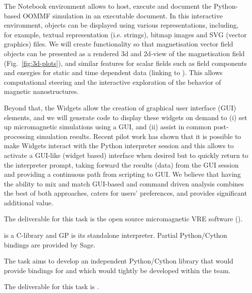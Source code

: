 \begin{workpackage}
\begin{tasklist}
\begin{task}[lead=USO,title=Case study: micromagnetic VRE built from
  \TheProject,id=oommf-py-ipython-attributes,PM=6,partners={SR,USH}]
  The \Jupyter Notebook environment allows to host, execute and
  document the Python-based OOMMF simulation in an executable
  document. In this interactive environment, objects can be displayed
  using various representations, including, for example, textual
  representation (i.e. strings), bitmap images and SVG (vector
  graphics) files. We will create functionality so that magnetisation
  vector field objects can be presented as a rendered 3d and 2d-view
  of the magnetisation field (Fig.~\ref{fig:3d-plots}), and similar
  features for scalar fields such as field components and energies for
  static and time dependent data (linking to
  ). This allows computational steering and the
  interactive exploration of the behavior of magnetic nanostructures.

  Beyond that, the \Jupyter Widgets allow the creation of graphical
  user interface (GUI) elements, and we will generate code to
  display these widgets on demand to (i) set up micromagnetic
  simulations using a GUI, and (ii) assist in common post-processing
  simulation results. Recent pilot work has shown that it is possible
  to make \Jupyter Widgets interact with the Python interpreter
  session and this allows to activate a GUI-like (widget based)
  interface when desired but to quickly return to the interpreter
  prompt, taking forward the results (data) from the GUI session
  \cite{IPython-widget-GUI-demo-youtube-2014} and providing a
  continuous path from scripting to GUI. We believe that having the
  ability to mix and match GUI-based and command driven analysis
  combines the best of both approaches, caters for users' preferences,
  and provides significant additional value.

  The deliverable for this task is the open source micromagnetic VRE
  software ().
\end{task}

\begin{task}[lead=UB,title=Python/Cython bindings for Pari,PM=16,id=pari-python]
  \Pari is a C-library and GP is its standalone interpreter. Partial
  Python/Cython bindings are provided by Sage.

  The task aims to develop an independent Python/Cython library that would provide
  bindings for \PariGP and which would tightly be developed within the \PariGP team.

  The deliverable for this task is .
\end{task}


\end{tasklist}
\end{workpackage}
